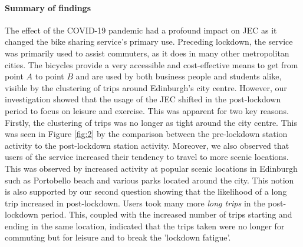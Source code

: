 \documentclass[11pt,a4paper]{article}
\begin{document}
\paragraph{Summary of findings}
The effect of the COVID-19 pandemic had a profound impact on JEC as it changed the bike sharing service's primary use. Preceding lockdown, the service was primarily used to assist commuters, as it does in many other metropolitan cities. The bicycles provide a very accessible and cost-effective means to get from point $A$ to point $B$ and are used by both business people and students alike, visible by the clustering of trips around Edinburgh's city centre. However, our investigation showed that the usage of the JEC shifted in the post-lockdown period to focus on leisure and exercise. This was apparent for two key reasons. Firstly, the clustering of trips was no longer as tight around the city centre. This was seen in Figure \ref{fig:2} by the comparison between the pre-lockdown station activity to the post-lockdown station activity. Moreover, we also observed that users of the service increased their tendency to travel to more scenic locations. This was observed by increased activity at popular scenic locations in Edinburgh such as Portobello beach and various parks located around the city. This notion is also supported by our second question showing that the likelihood of a long trip increased in post-lockdown. Users took many more \emph{long trips} in the post-lockdown period. This, coupled with the increased number of trips  starting and ending in the same location, indicated that the trips taken were no longer for commuting but for leisure and to break the 'lockdown fatigue'.
\end{document}
